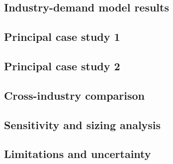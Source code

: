 \documentclass[12pt,letterpaper]{article}
\begin{document}
\subsection{Industry-demand model results}\label{sec38}

\subsection{Principal case study 1}\label{sec39}

\subsection{Principal case study 2}\label{sec40}

\subsection{Cross-industry comparison}\label{sec41}

\subsection{Sensitivity and sizing analysis}\label{sec42}

\subsection{Limitations and uncertainty}\label{sec43}
\end{document}

